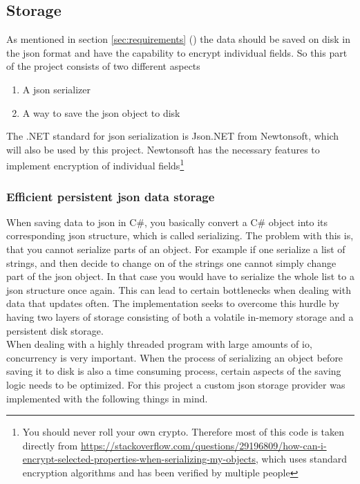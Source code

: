\documentclass{article}
\begin{document}
\subsection{Storage}
As mentioned in section \ref{sec:requirements} () the data should be saved on disk in the \gls{json} format and have the capability to encrypt individual fields. So this part of the project consists of two different aspects
\begin{enumerate}
    \item A \gls{json} serializer
    \item A way to save the \gls{json} object to disk
\end{enumerate}
The .NET standard for \gls{json} serialization is Json.NET from Newtonsoft\cite{url:considerations:newtonsoft}, which will also be used by this project. Newtonsoft has the necessary features to implement encryption of individual fields\footnote{You should never roll your own crypto. Therefore most of this code is taken directly from \url{https://stackoverflow.com/questions/29196809/how-can-i-encrypt-selected-properties-when-serializing-my-objects}, which uses standard encryption algorithms and has been verified by multiple people}
\\
\subsubsection{Efficient persistent \gls{json} data storage}
When saving data to \gls{json} in C\#, you basically convert a C\# object into its corresponding \gls{json} structure, which is called serializing. The problem with this is, that you cannot serialize parts of an object. For example if one serialize a list of strings, and then decide to change on of the strings one cannot simply change part of the \gls{json} object. In that case you would have to serialize the whole list to a \gls{json} structure once again. This can lead to certain bottlenecks when dealing with data that updates often. The implementation seeks to overcome this hurdle by having two layers of storage consisting of both a volatile in-memory storage and a persistent disk storage.
\\
When dealing with a highly threaded program with large amounts of \gls{io}, concurrency is very important. When the process of serializing an object before saving it to disk is also a time consuming process, certain aspects of the saving logic needs to be optimized. For this project a custom \gls{json} storage provider was implemented with the following things in mind.
\end{document}
